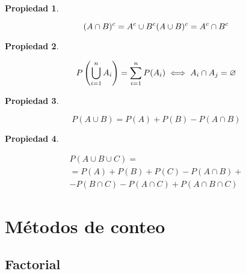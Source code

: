 \documentclass[a5paper,12pt,twoside]{book}
\newtheorem{prop}{{Propiedad}}[chapter]
\begin{document}
\begin{mdframed}[style=PropertyFrame]
    \begin{prop}
    \end{prop}
    \begin{equation*}
        (A \cap B)^c = A^c \cup B^c
        \\
        (A \cup B)^c = A^c \cap B^c
    \end{equation*}
\end{mdframed}

\begin{mdframed}[style=PropertyFrame]
    \begin{prop}
    \end{prop}
    \begin{equation*}
        P \left( \bigcup_{i=1}^n A_i \right) = \sum_{i=1}^n P(A_i)
        \iff A_i \cap A_j = \varnothing
    \end{equation*}
\end{mdframed}

\begin{mdframed}[style=PropertyFrame]
    \begin{prop}
    \end{prop}
    \begin{equation*}
        P(A \cup B) = P(A) + P(B) - P(A \cap B)
    \end{equation*}
\end{mdframed}

\begin{mdframed}[style=PropertyFrame]
    \begin{prop}
    \end{prop}
    \begin{gather*}
        P (A \cup B \cup C) =
        \\
        =P(A) + P(B) + P(C) - P(A \cap B) +
        \\
        - P(B \cap C) - P(A \cap C) + P(A \cap B \cap C)
    \end{gather*}
\end{mdframed}


\section{Métodos de conteo}


\subsection{Factorial}
\end{document}
